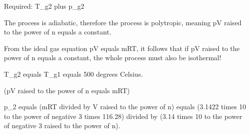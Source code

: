 Required: T_g2 plus p_g2

The process is adiabatic, therefore the process is polytropic, meaning pV raised to the power of n equals a constant.

From the ideal gas equation pV equals mRT, it follows that if pV raised to the power of n equals a constant, the whole process must also be isothermal!

T_g2 equals T_g1 equals 500 degrees Celsius.

(pV raised to the power of n equals mRT)

p_2 equals (mRT divided by V raised to the power of n) equals (3.1422 times 10 to the power of negative 3 times 116.28) divided by (3.14 times 10 to the power of negative 3 raised to the power of n).